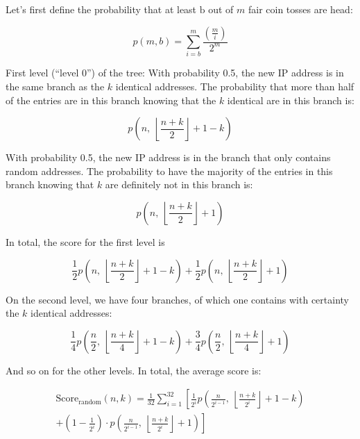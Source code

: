 Let's first define the probability that at least \(\text{b\ }\)out of
\(m\) fair coin tosses are head:

\[p(m,b) = \sum_{i = b}^{m}\frac{\left( \frac{m}{i} \right)}{2^{m}}\]


First level (``level 0'') of the tree: With probability 0.5, the new IP address is
in the same branch as the \(k\) identical addresses. The probability
that more than half of the entries are in this branch knowing that
the $k$ identical are in this branch is:

\[p\left( n,\ \left\lfloor \frac{n + k}{2} \right\rfloor + 1 - k \right)\]

With probability 0.5, the new IP address is in the branch that only
contains random addresses. The probability to have the majority of the
entries in this branch knowing that \(k\) are definitely not in this
branch is:

\[p\left( n,\ \left\lfloor \frac{n + k}{2} \right\rfloor + 1 \right)\]

In total, the score for the first level is

\[\frac{1}{2}p\left( n,\ \left\lfloor \frac{n + k}{2} \right\rfloor + 1 - k \right) + \frac{1}{2}p\left( n,\ \left\lfloor \frac{n + k}{2} \right\rfloor + 1 \right)\]

On the second level, we have four branches, of which one contains with
certainty the \(k\) identical addresses:

\[\frac{1}{4}p\left( \frac{n}{2},\ \left\lfloor \frac{n + k}{4} \right\rfloor + 1 - k \right) + \frac{3}{4}p\left( \frac{n}{2},\ \left\lfloor \frac{n + k}{4} \right\rfloor + 1 \right)\]

And so on for the other levels. In total, the average score is:

\[
\begin{split}
\text{Score}_{\text{random}}(n,k) = \frac{1}{32} \sum_{i = 1}^{32}\left\lbrack \frac{1}{2^{i}}p\left( \frac{n}{2^{i - 1}},\ \left\lfloor \frac{n + k}{2^{i}} \right\rfloor + 1 - k \right)\right. \\
+ \left.\left( 1 - \frac{1}{2^{i}} \right) \cdot p\left( \frac{n}{2^{i - 1}},\ \left\lfloor \frac{n + k}{2^{i}} \right\rfloor + 1 \right) \right\rbrack
\end{split}
\]



